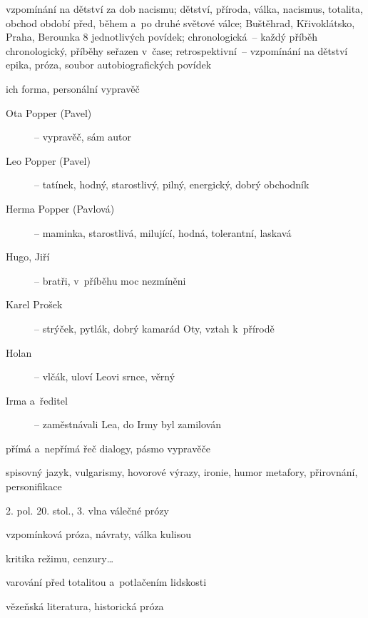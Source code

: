 {
vzpomínání na dětství za dob nacismu; dětství, příroda, válka, nacismus, totalita, obchod
období před, během a~po druhé světové válce; Buštěhrad, Křivoklátsko, Praha, Berounka
8 jednotlivých povídek; chronologická~-- každý příběh chronologický, příběhy
seřazen v~čase; retrospektivní~-- vzpomínání na dětství
epika, próza, soubor autobiografických povídek

\newpart

ich forma, personální vypravěč
\begin{description}
\item[Ota Popper (Pavel)] – vypravěč, sám autor
\item[Leo Popper (Pavel)] – tatínek, hodný, starostlivý, pilný, energický, dobrý obchodník
\item[Herma Popper (Pavlová)] – maminka, starostlivá, milující, hodná, tolerantní, laskavá
\item[Hugo, Jiří] – bratři, v~příběhu moc nezmíněni
\item[Karel Prošek] – strýček, pytlák, dobrý kamarád Oty, vztah k~přírodě
\item[Holan] – vlčák, uloví Leovi srnce, věrný
\item[Irma a~ředitel] – zaměstnávali Lea, do Irmy byl zamilován 
\end{description}

přímá a~nepřímá řeč
dialogy, pásmo vypravěče

\newpart

spisovný jazyk, vulgarismy, hovorové výrazy, ironie, humor
metafory, přirovnání, personifikace

\begin{compactitem}
	\item 2. pol. 20. stol., 3. vlna válečné prózy
	\item vzpomínková próza, návraty, válka kulisou
	\item kritika režimu, cenzury\dots
	\item varování před totalitou a~potlačením lidskosti
	\item vězeňská literatura, historická próza
\end{compactitem}

}
